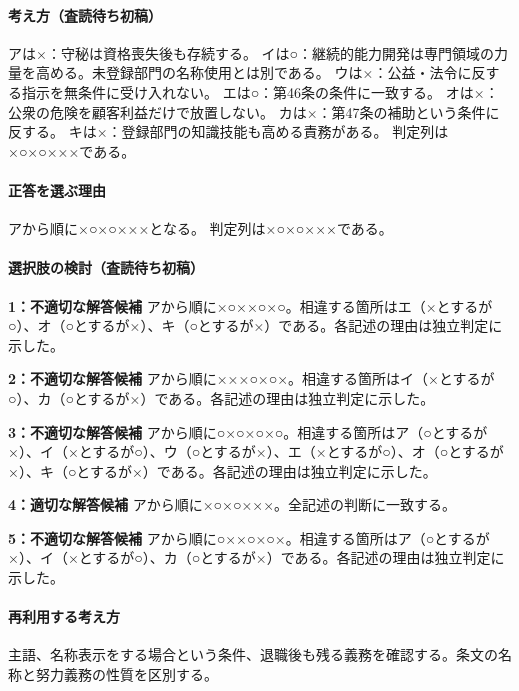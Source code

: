 \paragraph{考え方（査読待ち初稿）} アは×：守秘は資格喪失後も存続する。 イは○：継続的能力開発は専門領域の力量を高める。未登録部門の名称使用とは別である。 ウは×：公益・法令に反する指示を無条件に受け入れない。 エは○：第46条の条件に一致する。 オは×：公衆の危険を顧客利益だけで放置しない。 カは×：第47条の補助という条件に反する。 キは×：登録部門の知識技能も高める責務がある。 判定列は×○×○×××である。

\paragraph{正答を選ぶ理由} アから順に×○×○×××となる。  判定列は×○×○×××である。

\paragraph{選択肢の検討（査読待ち初稿）}\mbox{}\par

\noindent\textbf{1：不適切な解答候補} アから順に×○××○×○。相違する箇所はエ（×とするが○）、オ（○とするが×）、キ（○とするが×）である。各記述の理由は独立判定に示した。\par

\noindent\textbf{2：不適切な解答候補} アから順に×××○×○×。相違する箇所はイ（×とするが○）、カ（○とするが×）である。各記述の理由は独立判定に示した。\par

\noindent\textbf{3：不適切な解答候補} アから順に○×○×○×○。相違する箇所はア（○とするが×）、イ（×とするが○）、ウ（○とするが×）、エ（×とするが○）、オ（○とするが×）、キ（○とするが×）である。各記述の理由は独立判定に示した。\par

\noindent\textbf{4：適切な解答候補} アから順に×○×○×××。全記述の判断に一致する。\par

\noindent\textbf{5：不適切な解答候補} アから順に○××○×○×。相違する箇所はア（○とするが×）、イ（×とするが○）、カ（○とするが×）である。各記述の理由は独立判定に示した。\par

\paragraph{再利用する考え方} 主語、名称表示をする場合という条件、退職後も残る義務を確認する。条文の名称と努力義務の性質を区別する。

